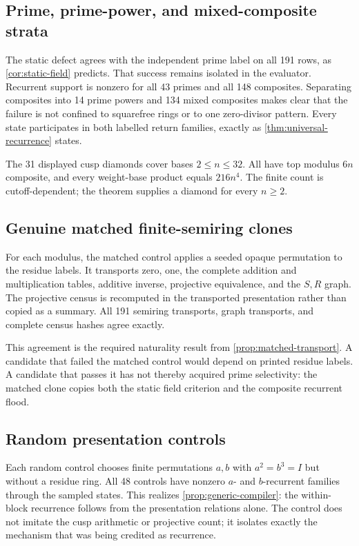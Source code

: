 \subsection{Prime, prime-power, and mixed-composite strata}

The static defect agrees with the independent prime label on all 191 rows,
as \cref{cor:static-field} predicts.  That success remains isolated in the
evaluator.  Recurrent support is nonzero for all 43 primes and all 148
composites.  Separating composites into 14 prime powers and 134 mixed
composites makes clear that the failure is not confined to squarefree rings
or to one zero-divisor pattern.  Every state participates in both labelled
return families, exactly as \cref{thm:universal-recurrence} states.

The 31 displayed cusp diamonds cover bases $2\le n\le32$.  All have top
modulus $6n$ composite, and every weight-base product equals $216n^4$.  The
finite count is cutoff-dependent; the theorem supplies a diamond for every
$n\ge2$.

\subsection{Genuine matched finite-semiring clones}

For each modulus, the matched control applies a seeded opaque permutation to
the residue labels.  It transports zero, one, the complete addition and
multiplication tables, additive inverse, projective equivalence, and the
$S,R$ graph.  The projective census is recomputed in the transported
presentation rather than copied as a summary.  All 191 semiring transports,
graph transports, and complete census hashes agree exactly.

This agreement is the required naturality result from
\cref{prop:matched-transport}.  A candidate that failed the matched control
would depend on printed residue labels.  A candidate that passes it has not
thereby acquired prime selectivity: the matched clone copies both the static
field criterion and the composite recurrent flood.

\subsection{Random presentation controls}

Each random control chooses finite permutations $a,b$ with $a^2=b^3=I$ but
without a residue ring.  All 48 controls have nonzero $a$- and $b$-recurrent
families through the sampled states.  This realizes
\cref{prop:generic-compiler}: the within-block recurrence follows from the
presentation relations alone.  The control does not imitate the cusp
arithmetic or projective count; it isolates exactly the mechanism that was
being credited as recurrence.


